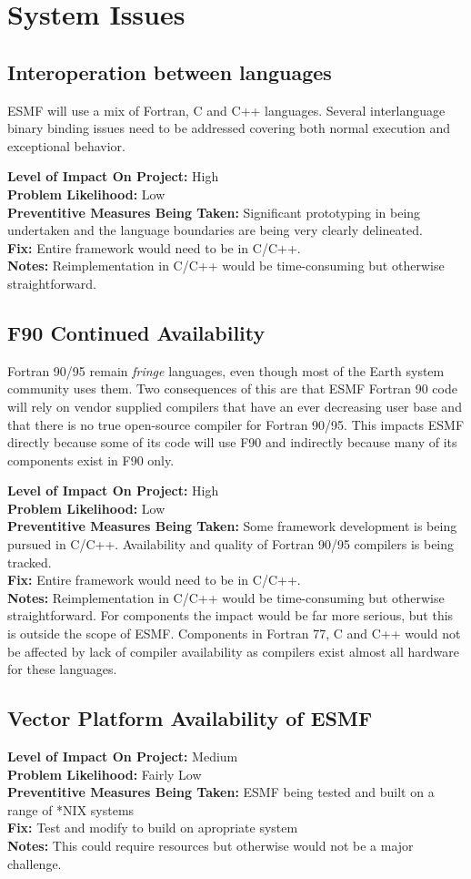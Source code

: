 \documentclass[english]{article}
\newcommand{\req}[1]{\section{\hspace{.2in}#1}}
\newcommand{\sreq}[1]{\subsection{\hspace{.2in}#1}}
\newenvironment
{reqlist}
{\begin{list} {} {} \rm \item[]}
{\end{list}}
\begin{document}
\req{System Issues}
\sreq{Interoperation between languages}
ESMF will use a mix of Fortran, C and C++ languages. Several interlanguage binary binding
issues need to be addressed covering both normal execution and exceptional
behavior.
\begin{reqlist}
{\bf Level of Impact On Project:} High \\
{\bf Problem Likelihood:} Low\\
{\bf Preventitive Measures Being Taken:} Significant prototyping in being undertaken and
the language boundaries are being very clearly delineated.\\
{\bf Fix:} Entire framework would need to be in C/C++.\\
{\bf Notes:} Reimplementation in C/C++ would be time-consuming but
otherwise straightforward.
\end{reqlist}

\sreq{F90 Continued Availability}
Fortran 90/95 remain {\it fringe} languages, even though most of the Earth system
community uses them. Two consequences of this are that ESMF Fortran 90 code will
rely on vendor supplied compilers that have an ever decreasing user base and
that there is no true open-source compiler for Fortran 90/95.
This impacts ESMF directly because some of its code will use F90 and
indirectly because many of its components exist in F90 only.
\begin{reqlist}
{\bf Level of Impact On Project:} High \\
{\bf Problem Likelihood:} Low\\
{\bf Preventitive Measures Being Taken:} Some framework development is being pursued in C/C++.
Availability and quality of Fortran 90/95 compilers
is being tracked.\\
{\bf Fix:} Entire framework would need to be in C/C++.\\
{\bf Notes:} Reimplementation in C/C++ would be time-consuming but
otherwise straightforward. For components the impact would be far more
serious, but this is outside the scope of ESMF.
Components in Fortran 77, C and C++ would not be affected by lack of 
compiler availability as compilers exist almost all hardware for these languages.
\end{reqlist}

\sreq{Vector Platform Availability of ESMF}
\begin{reqlist}
{\bf Level of Impact On Project:} Medium \\
{\bf Problem Likelihood:} Fairly Low\\
{\bf Preventitive Measures Being Taken:} ESMF being tested and built on a range of *NIX systems \\
{\bf Fix:} Test and modify to build on apropriate system\\
{\bf Notes:} This could require resources but otherwise would not be a major challenge.
\end{reqlist}
\end{document}
